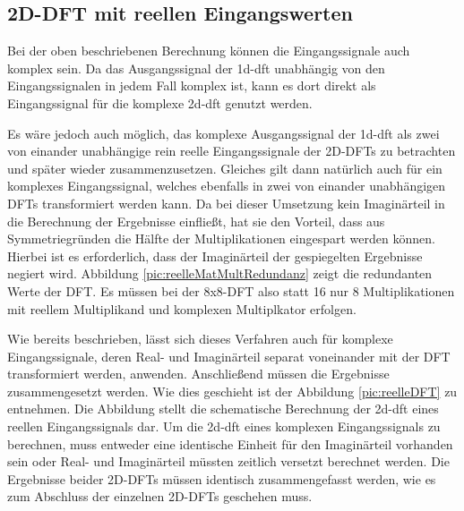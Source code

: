 \subsection{2D-DFT mit reellen Eingangswerten}\label{sec:rein_reelle_dft}
Bei der oben beschriebenen Berechnung können die Eingangssignale auch komplex sein. Da das Ausgangssignal der \gls{1d-dft} unabhängig von den Eingangssignalen in jedem Fall 
komplex ist, kann es dort direkt als Eingangssignal für die komplexe \gls{2d-dft} genutzt werden. 

Es wäre jedoch auch möglich, das komplexe Ausgangssignal der \gls{1d-dft} als zwei von einander unabhängige rein reelle Eingangssignale der 2D-DFTs zu betrachten und später 
wieder zusammenzusetzen. Gleiches gilt dann natürlich auch für ein komplexes Eingangssignal, welches ebenfalls in zwei von einander unabhängigen DFTs transformiert werden kann.
Da bei dieser Umsetzung kein Imaginärteil in die Berechnung der Ergebnisse einfließt, hat sie den Vorteil, dass aus Symmetriegründen die Hälfte der Multiplikationen 
eingespart werden können. Hierbei ist es erforderlich, dass der Imaginärteil der gespiegelten Ergebnisse negiert wird. Abbildung \ref{pic:reelleMatMultRedundanz} zeigt die 
redundanten Werte der DFT. Es müssen bei der 8x8-DFT also statt 16 nur 8 Multiplikationen mit reellem Multiplikand und komplexen Multiplkator erfolgen.

Wie bereits beschrieben, lässt sich dieses Verfahren auch für komplexe Eingangssignale, deren Real- und Imaginärteil separat voneinander mit der DFT transformiert werden, anwenden.
Anschließend müssen die Ergebnisse zusammengesetzt werden. Wie dies geschieht ist der Abbildung \ref{pic:reelleDFT} zu entnehmen.
Die Abbildung stellt die schematische Berechnung der \gls{2d-dft} eines reellen Eingangssignals dar. 
Um die \gls{2d-dft} eines komplexen Eingangssignals zu berechnen, muss entweder eine identische Einheit für den Imaginärteil vorhanden sein oder Real- und Imaginärteil müssten
zeitlich versetzt berechnet werden. Die Ergebnisse beider 2D-DFTs müssen identisch zusammengefasst werden, wie es zum Abschluss der einzelnen 2D-DFTs geschehen muss.

